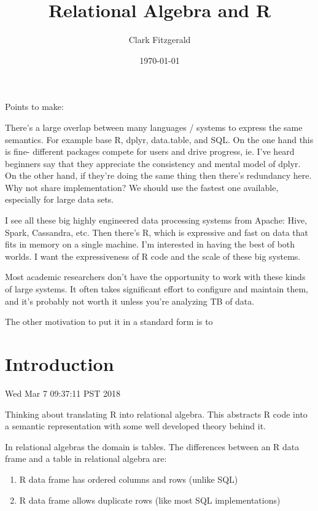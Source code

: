 \documentclass[12pt]{article}
\begin{document}
\title{Relational Algebra and R}
\date{\today}
\author{Clark Fitzgerald}
\maketitle

Points to make:

There's a large overlap between many languages / systems to express the
same semantics. For example base R, dplyr, data.table, and SQL.
On the one hand this is fine- different packages compete for users and
drive progress, ie. I've heard beginners say that they appreciate the
consistency and mental model of dplyr.  On the other hand, if they're doing
the same thing then there's redundancy here.  Why not share implementation?
We should use the fastest one available, especially for large data sets.

I see all these big highly engineered data processing systems
from Apache: Hive, Spark, Cassandra, etc. Then there's R, which is
expressive and fast on data that fits in memory on a single machine.
I'm interested in having the best of both worlds. I want the expressiveness
of R code and the scale of these big systems.

Most academic researchers don't have the opportunity to work with
these kinds of large systems. It often takes significant effort to
configure and maintain them, and it's probably not worth it unless you're
analyzing TB of data.

The other motivation to put it in a standard form is to 

\section{Introduction}

Wed Mar  7 09:37:11 PST 2018

Thinking about translating R into relational algebra.
This abstracts R code into a semantic representation with some well
developed theory behind it.

In relational algebras the domain is tables. The differences between an R
data frame and a table in relational algebra are:

\begin{enumerate}
    \item R data frame has ordered columns and rows (unlike SQL)
    \item R data frame allows duplicate rows (like most SQL implementations)
\end{enumerate}
\end{document}
